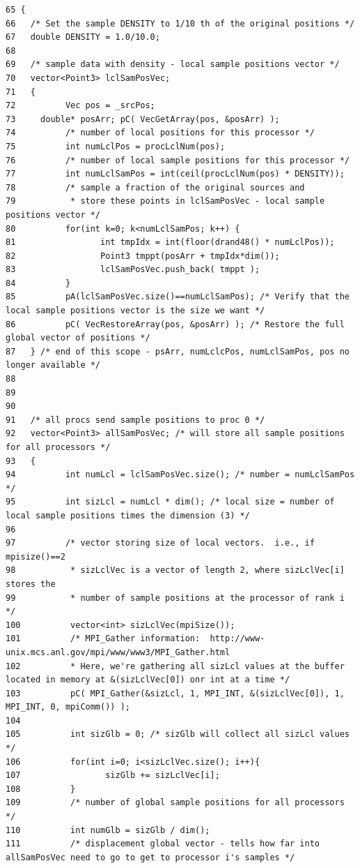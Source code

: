 \footnotesize\begin{verbatim}65 {
66   /* Set the sample DENSITY to 1/10 th of the original positions */
67   double DENSITY = 1.0/10.0;
68   
69   /* sample data with density - local sample positions vector */
70   vector<Point3> lclSamPosVec;
71   {
72          Vec pos = _srcPos;
73     double* posArr; pC( VecGetArray(pos, &posArr) );
74          /* number of local positions for this processor */
75          int numLclPos = procLclNum(pos);
76          /* number of local sample positions for this processor */
77          int numLclSamPos = int(ceil(procLclNum(pos) * DENSITY));
78          /* sample a fraction of the original sources and
79           * store these points in lclSamPosVec - local sample positions vector */
80          for(int k=0; k<numLclSamPos; k++) {
81                 int tmpIdx = int(floor(drand48() * numLclPos));
82                 Point3 tmppt(posArr + tmpIdx*dim());
83                 lclSamPosVec.push_back( tmppt );
84          }
85          pA(lclSamPosVec.size()==numLclSamPos); /* Verify that the local sample positions vector is the size we want */
86          pC( VecRestoreArray(pos, &posArr) ); /* Restore the full global vector of positions */
87   } /* end of this scope - psArr, numLclcPos, numLclSamPos, pos no longer available */
88 
89   
90   
91   /* all procs send sample positions to proc 0 */
92   vector<Point3> allSamPosVec; /* will store all sample positions for all processors */
93   {
94          int numLcl = lclSamPosVec.size(); /* number = numLclSamPos */
95          int sizLcl = numLcl * dim(); /* local size = number of local sample positions times the dimension (3) */
96 
97          /* vector storing size of local vectors.  i.e., if mpisize()==2
98           * sizLclVec is a vector of length 2, where sizLclVec[i] stores the
99           * number of sample positions at the processor of rank i */
100          vector<int> sizLclVec(mpiSize()); 
101          /* MPI_Gather information:  http://www-unix.mcs.anl.gov/mpi/www/www3/MPI_Gather.html
102          * Here, we're gathering all sizLcl values at the buffer located in memory at &(sizLclVec[0]) onr int at a time */
103          pC( MPI_Gather(&sizLcl, 1, MPI_INT, &(sizLclVec[0]), 1, MPI_INT, 0, mpiComm()) );
104          
105          int sizGlb = 0; /* sizGlb will collect all sizLcl values */
106          for(int i=0; i<sizLclVec.size(); i++){
107                 sizGlb += sizLclVec[i];
108          }
109          /* number of global sample positions for all processors */
110          int numGlb = sizGlb / dim(); 
111          /* displacement global vector - tells how far into allSamPosVec need to go to get to processor i's samples */

\end{verbatim}
